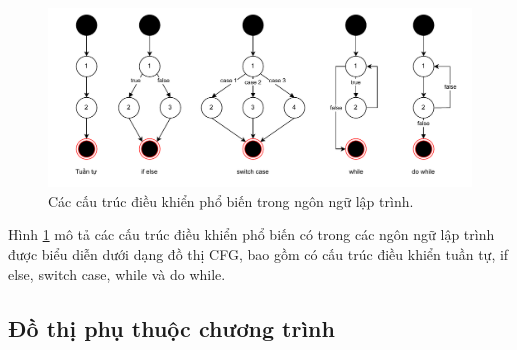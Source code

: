 \begin{figure}[H]
  \includegraphics[width=1\columnwidth] {figures/c2/c2_cfg_line.drawio.pdf}
  \centering
  \caption{Các cấu trúc điều khiển phổ biến trong ngôn ngữ lập trình.}
  \label{img:c2_cfg_line}
\end{figure}

Hình \ref{img:c2_cfg_line} mô tả các cấu trúc điều khiển phổ biến có trong các ngôn ngữ lập trình được biểu diễn dưới dạng đồ thị CFG, bao gồm có cấu trúc điều khiển tuần tự, if else, switch case, while và do while.

\subsection{Đồ thị phụ thuộc chương trình}



